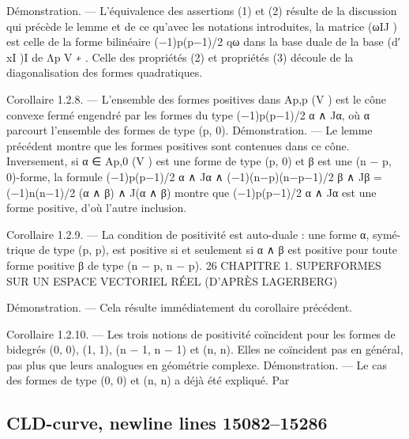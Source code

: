 \documentclass[
  10pt,
]{article}
\newenvironment{Shaded}{}{}
\newcommand{\NormalTok}[1]{#1}
\begin{document}
\begin{Shaded}
\begin{Highlighting}[]
\NormalTok{Démonstration. — L’équivalence des assertions (1) et (2) résulte de la discussion qui}
\NormalTok{précède le lemme et de ce qu’avec les notations introduites, la matrice (ωIJ ) est celle de}
\NormalTok{la forme bilinéaire (−1)p(p−1)/2 qω dans la base duale de la base (d′ xI )I de Λp V ∗ . Celle des}
\NormalTok{propriétés (2) et propriétés (3) découle de la diagonalisation des formes quadratiques.}

\NormalTok{Corollaire 1.2.8. — L’ensemble des formes positives dans Ap,p (V ) est le cône convexe}
\NormalTok{fermé engendré par les formes du type (−1)p(p−1)/2 α ∧ Jα, où α parcourt l’ensemble des}
\NormalTok{formes de type (p, 0).}
\NormalTok{Démonstration. — Le lemme précédent montre que les formes positives sont contenues}
\NormalTok{dans ce cône. Inversement, si α ∈ Ap,0 (V ) est une forme de type (p, 0) et β est une}
\NormalTok{(n − p, 0){-}forme, la formule}
\NormalTok{     (−1)p(p−1)/2 α ∧ Jα ∧ (−1)(n−p)(n−p−1)/2 β ∧ Jβ = (−1)n(n−1)/2 (α ∧ β) ∧ J(α ∧ β)}
\NormalTok{montre que (−1)p(p−1)/2 α ∧ Jα est une forme positive, d’où l’autre inclusion.}

\NormalTok{Corollaire 1.2.9. — La condition de positivité est auto{-}duale : une forme α, symé{-}}
\NormalTok{trique de type (p, p), est positive si et seulement si α ∧ β est positive pour toute forme}
\NormalTok{positive β de type (n − p, n − p).}
\NormalTok{26 CHAPITRE 1. SUPERFORMES SUR UN ESPACE VECTORIEL RÉEL (D’APRÈS LAGERBERG)}

\NormalTok{Démonstration. — Cela résulte immédiatement du corollaire précédent.}

\NormalTok{Corollaire 1.2.10. — Les trois notions de positivité coïncident pour les formes de}
\NormalTok{bidegrés (0, 0), (1, 1), (n − 1, n − 1) et (n, n).}
\NormalTok{   Elles ne coïncident pas en général, pas plus que leurs analogues en géométrie complexe.}
\NormalTok{Démonstration. — Le cas des formes de type (0, 0) et (n, n) a déjà été expliqué. Par}
\end{Highlighting}
\end{Shaded}

\subsection{CLD-curve, newline lines
15082--15286}\label{cld-curve-newline-lines-1508215286}
\end{document}
